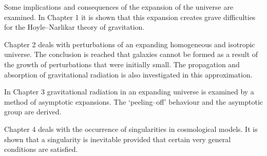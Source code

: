 Some implications and consequences of the expansion of the universe are examined. 
In Chapter 1 it is shown that this expansion creates grave difficulties for the Hoyle–Narlikar theory of gravitation. 

Chapter 2 deals with perturbations of an expanding homogeneous and isotropic universe. 
The conclusion is reached that galaxies cannot be formed as a result of the growth of perturbations that were initially small. 
The propagation and absorption of gravitational radiation is also investigated in this approximation. 

In Chapter 3 gravitational radiation in an expanding universe is examined by a method of asymptotic expansions. 
The ‘peeling–off’ behaviour and the asymptotic group are derived. 

Chapter 4 deals with the occurrence of singularities in cosmological models. 
It is shown that a singularity is inevitable provided that certain very general conditions are satisfied.
